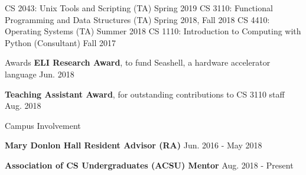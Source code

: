 \documentclass[letterpaper,MMMyyyy,nonstopmode]{simpleresumecv}
\begin{document}
\begin{Body}

\BulletItem CS 2043: Unix Tools and Scripting (TA) \hfill Spring 2019
\BulletItem CS 3110: Functional Programming and Data Structures (TA) \hfill Spring 2018, Fall 2018
\BulletItem CS 4410: Operating Systems (TA) \hfill Summer 2018
\BulletItem CS 1110: Introduction to Computing with Python (Consultant) \hfill Fall 2017

\Section
{Awards}{}{}
\BulletItem
\textbf{ELI Research Award}, to fund Seashell, a hardware accelerator language
\hfill
Jun. 2018

\BulletItem
\textbf{Teaching Assistant Award}, for outstanding contributions to CS 3110 staff
\hfill
Aug. 2018

\Section
{Campus Involvement}{}{}

\BulletItem
\textbf{Mary Donlon Hall Resident Advisor (RA)}
\hfill
Jun. 2016 - May 2018

\BulletItem
\textbf{Association of CS Undergraduates (ACSU) Mentor}
\hfill
Aug. 2018 - Present


\end{Body}
\end{document}
